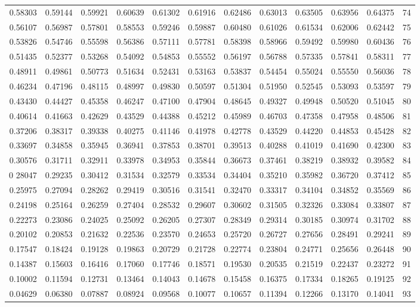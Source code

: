 \begin{center}
\begin{tabular}{|rrrrrrrrrrr|r|}
0.58303&0.59144&0.59921&0.60639&0.61302&0.61916&0.62486&0.63013&0.63505&0.63956&0.64375&74\\[5pt]
0.56107&0.56987&0.57801&0.58553&0.59246&0.59887&0.60480&0.61026&0.61534&0.62006&0.62442&75\\
0.53826&0.54746&0.55598&0.56386&0.57111&0.57781&0.58398&0.58966&0.59492&0.59980&0.60436&76\\
0.51435&0.52377&0.53268&0.54092&0.54853&0.55552&0.56197&0.56788&0.57335&0.57841&0.58311&77\\
0.48911&0.49861&0.50773&0.51634&0.52431&0.53163&0.53837&0.54454&0.55024&0.55550&0.56036&78\\
0.46234&0.47196&0.48115&0.48997&0.49830&0.50597&0.51304&0.51950&0.52545&0.53093&0.53597&79\\[5pt]
0.43430&0.44427&0.45358&0.46247&0.47100&0.47904&0.48645&0.49327&0.49948&0.50520&0.51045&80\\
0.40614&0.41663&0.42629&0.43529&0.44388&0.45212&0.45989&0.46703&0.47358&0.47958&0.48506&81\\
0.37206&0.38317&0.39338&0.40275&0.41146&0.41978&0.42778&0.43529&0.44220&0.44853&0.45428&82\\
0.33697&0.34858&0.35945&0.36941&0.37853&0.38701&0.39513&0.40288&0.41019&0.41690&0.42300&83\\
0.30576&0.31711&0.32911&0.33978&0.34953&0.35844&0.36673&0.37461&0.38219&0.38932&0.39582&84\\[5pt]
0 28047&0.29235&0.30412&0.31534&0.32579&0.33534&0.34404&0.35210&0.35982&0.36720&0.37412&85\\
0.25975&0.27094&0.28262&0.29419&0.30516&0.31541&0.32470&0.33317&0.34104&0.34852&0.35569&86\\
0.24198&0.25164&0.26259&0.27404&0.28532&0.29607&0.30602&0.31505&0.32326&0.33084&0.33807&87\\
0.22273&0.23086&0.24025&0.25092&0.26205&0.27307&0.28349&0.29314&0.30185&0.30974&0.31702&88\\
0.20102&0.20853&0.21632&0.22536&0.23570&0.24653&0.25720&0.26727&0.27656&0.28491&0.29241&89\\[5pt]
0.17547&0.18424&0.19128&0.19863&0.20729&0.21728&0.22774&0.23804&0.24771&0.25656&0.26448&90\\
0.14387&0.15603&0.16416&0.17060&0.17746&0.18571&0.19530&0.20535&0.21519&0.22437&0.23272&91\\
0.10002&0.11594&0.12731&0.13464&0.14043&0.14678&0.15458&0.16375&0.17334&0.18265&0.19125&92\\
0.04629&0.06380&0.07887&0.08924&0.09568&0.10077&0.10657&0.11394&0.12266&0.13170&0.14041&93\\

\end{tabular}
\end{center}
